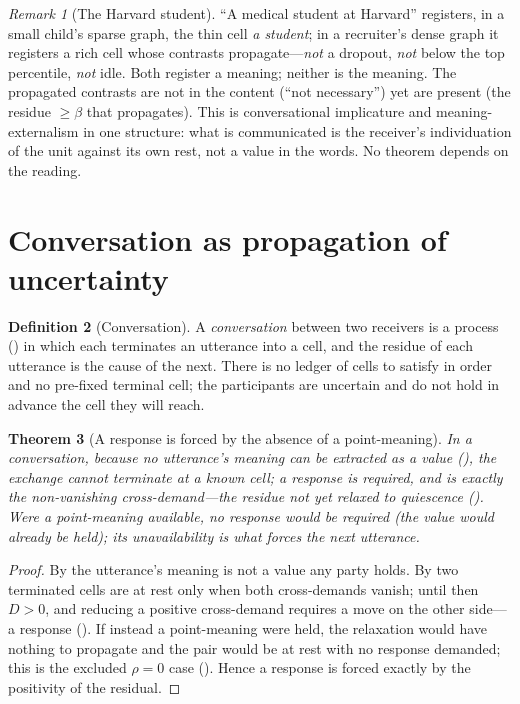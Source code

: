 \documentclass[twocolumn,11pt,a4paper]{article}
\theoremstyle{sup}
\newtheorem{theorem}{Theorem}[section]
\theoremstyle{definition}
\newtheorem{definition}[theorem]{Definition}
\theoremstyle{remark}
\newtheorem{remark}[theorem]{Remark}
\newcommand{\flo}{\beta}
\newcommand{\res}{\rho}
\newcommand{\dem}{D}
\begin{document}
\begin{remark}[The Harvard student]
\label{rem:harvard}
``A medical student at Harvard'' registers, in a small child's sparse graph, the
thin cell \emph{a student}; in a recruiter's dense graph it registers a rich
cell whose contrasts propagate---\emph{not} a dropout, \emph{not} below the top
percentile, \emph{not} idle. Both register a meaning; neither is the meaning. The
propagated contrasts are not in the content (``not necessary'') yet are present
(the residue $\ge\flo$ that propagates). This is conversational implicature
\citep{grice1975,sperberwilson1986} and meaning-externalism \citep{putnam1975}
in one structure: what is communicated is the receiver's individuation of the
unit against its own rest, not a value in the words. No theorem depends on the
reading.
\end{remark}

\section{Conversation as propagation of uncertainty}
\label{sec:conversation}

\begin{definition}[Conversation]
\label{def:conversation}
A \emph{conversation} between two receivers is a process () in
which each terminates an utterance into a cell, and the residue of each
utterance is the cause of the next. There is no ledger of cells to satisfy in
order and no pre-fixed terminal cell; the participants are uncertain and do not
hold in advance the cell they will reach.
\end{definition}

\begin{theorem}[A response is forced by the absence of a point-meaning]
\label{thm:response}
In a conversation, because no utterance's meaning can be extracted as a value
(), the exchange cannot terminate at a known cell; a
response is required, and is exactly the non-vanishing cross-demand---the residue
not yet relaxed to quiescence (). Were a point-meaning available,
no response would be required (the value would already be held); its
unavailability is what forces the next utterance.
\end{theorem}

\begin{proof}
By  the utterance's meaning is not a value any party
holds. By  two terminated cells are at rest only when both
cross-demands vanish; until then $\dem>0$, and reducing a positive cross-demand
requires a move on the other side---a response (). If instead a
point-meaning were held, the relaxation would have nothing to propagate and the
pair would be at rest with no response demanded; this is the excluded $\res=0$
case (). Hence a response is forced exactly by the positivity of
the residual.
\end{proof}
\end{document}
